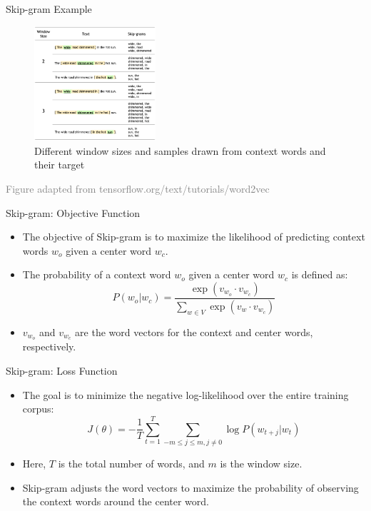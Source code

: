 \documentclass[serif, aspectratio=169]{beamer}
\begin{document}
\begin{frame}{Skip-gram Example}
    \begin{figure}
        \centering
        \includegraphics[width=0.4\textwidth]{pic/10.png}
        \caption*{Different window sizes and samples drawn from context words and their target}
    \end{figure}
    \vspace{0.1cm}
    \hspace{-1.0cm}
    {\tiny \textcolor{gray}{Figure adapted from tensorflow.org/text/tutorials/word2vec}}
\end{frame}



\begin{frame}{Skip-gram: Objective Function}
    \begin{itemize}
        \item The objective of Skip-gram is to maximize the likelihood of predicting context words \(w_o\) given a center word \(w_c\).
        \item The probability of a context word \(w_o\) given a center word \(w_c\) is defined as:
        \[
        P(w_o | w_c) = \frac{\exp(v_{w_o} \cdot v_{w_c})}{\sum_{w \in V} \exp(v_w \cdot v_{w_c})}
        \]
        \item \(v_{w_o}\) and \(v_{w_c}\) are the word vectors for the context and center words, respectively.
    \end{itemize}
\end{frame}

\begin{frame}{Skip-gram: Loss Function}
    \begin{itemize}
        \item The goal is to minimize the negative log-likelihood over the entire training corpus:
        \[
        J(\theta) = -\frac{1}{T} \sum_{t=1}^{T} \sum_{-m \leq j \leq m, j \neq 0} \log P(w_{t+j} | w_t)
        \]
        \item Here, \(T\) is the total number of words, and \(m\) is the window size.
        \item Skip-gram adjusts the word vectors to maximize the probability of observing the context words around the center word.
    \end{itemize}
\end{frame}
\end{document}
